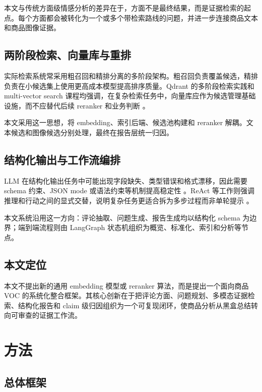\documentclass[11pt]{article}
\begin{document}
本文与传统方面级情感分析的差异在于，方面不是最终结果，而是证据检索的起点。每个方面都会被转化为一个或多个带检索路线的问题，并进一步连接商品文本和商品图像证据。

\subsection{两阶段检索、向量库与重排}

实际检索系统常采用粗召回和精排分离的多阶段架构。粗召回负责覆盖候选，精排负责在小候选集上使用更高成本模型提高排序质量。Qdrant 的多阶段检索实践和 multi-vector search 课程均强调，在复杂检索任务中，向量库应作为候选管理基础设施，而不应替代后续 reranker 和业务判断 \citep{qdrant2024pdfRetrievalAtScale,qdrant2024multiVectorCourse}。

本文采用这一思想，将 embedding、索引后端、候选池构建和 reranker 解耦。文本候选和图像候选分别处理，最终在报告层统一归因。

\subsection{结构化输出与工作流编排}

LLM 在结构化输出任务中可能出现字段缺失、类型错误和格式漂移，因此需要 schema 约束、JSON mode 或语法约束等机制提高稳定性 \citep{liu2024structuredOutputBenchmark,geng2023grammarConstrainedDecoding}。ReAct 等工作则强调推理和行动之间的显式交替，说明复杂任务更适合拆为多步过程而非单轮提示 \citep{yao2023react}。

本文系统沿用这一方向：评论抽取、问题生成、报告生成均以结构化 schema 为边界；端到端流程则由 LangGraph 状态机组织为概览、标准化、索引和分析等节点。

\subsection{本文定位}

本文不提出新的通用 embedding 模型或 reranker 算法，而是提出一个面向商品 VOC 的系统化整合框架。其核心创新在于把评论方面、问题规划、多模态证据检索、结构化报告和 claim 级归因组织为一个可复现闭环，使商品分析从黑盒总结转向可审查的证据工作流。

\section{方法}
\subsection{总体框架}
\end{document}
